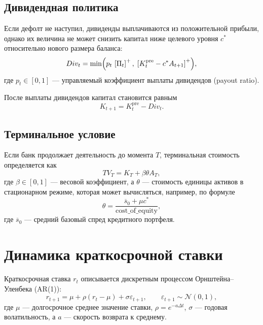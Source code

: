 \documentclass[11pt,a4paper]{article}
\newcommand{\1}{\mathbf{1}}
\newcommand{\pos}[1]{\left[#1\right]^+}
\begin{document}
\subsection{Дивидендная политика}

Если дефолт не наступил, дивиденды выплачиваются из положительной прибыли, однако их величина не может снизить капитал ниже целевого уровня $c^*$ относительно нового размера баланса:
\begin{equation}
    Div_t=
    \min\Bigl(
    p_t\,\pos{\Pi_t},
    \;
    \pos{K_t^{\text{pre}}-c^*A_{t+1}}
    \Bigr),
\end{equation}
где $p_t\in[0,1]$ --- управляемый коэффициент выплаты дивидендов (payout ratio).

После выплаты дивидендов капитал становится равным
\begin{equation}
    K_{t+1}=K_t^{\text{pre}}-Div_t.
\end{equation}

\subsection{Терминальное условие}

Если банк продолжает деятельность до момента $T$, терминальная стоимость определяется как
\begin{equation}
    TV_T=K_T+\beta\theta A_T,
\end{equation}
где $\beta\in[0,1]$ --- весовой коэффициент, а $\theta$ --- стоимость единицы активов в стационарном режиме, которая может вычисляться, например, по формуле
\begin{equation}
    \theta=
    \frac{
    \overline{s}_0+\mu c^*
    }{
    \text{cost\_of\_equity}
    },
\end{equation}
где $\overline{s}_0$ --- средний базовый спред кредитного портфеля.

\section{Динамика краткосрочной ставки}

Краткосрочная ставка $r_t$ описывается дискретным процессом Орнштейна--Уленбека (AR(1)):
\begin{equation}
    r_{t+1}
    =
    \mu+\rho(r_t-\mu)+\sigma\varepsilon_{t+1},
    \qquad
    \varepsilon_{t+1}\sim\mathcal{N}(0,1),
\end{equation}
где $\mu$ --- долгосрочное среднее значение ставки, $\rho=e^{-a\Delta t}$, $\sigma$ --- годовая волатильность, а $a$ --- скорость возврата к среднему.
\end{document}
